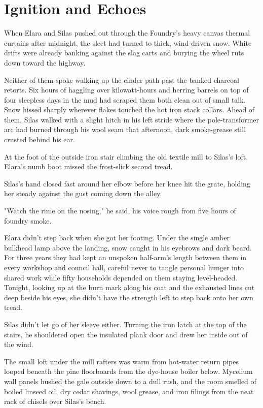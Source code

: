 \chapter{Ignition and Echoes}

When Elara and Silas pushed out through the Foundry's heavy canvas thermal curtains after midnight, the sleet had turned to thick, wind-driven snow. White drifts were already banking against the slag carts and burying the wheel ruts down toward the highway.

Neither of them spoke walking up the cinder path past the banked charcoal retorts. Six hours of haggling over kilowatt-hours and herring barrels on top of four sleepless days in the mud had scraped them both clean out of small talk. Snow hissed sharply wherever flakes touched the hot iron stack collars. Ahead of them, Silas walked with a slight hitch in his left stride where the pole-transformer arc had burned through his wool seam that afternoon, dark smoke-grease still crusted behind his ear.

At the foot of the outside iron stair climbing the old textile mill to Silas's loft, Elara's numb boot missed the frost-slick second tread.

Silas's hand closed fast around her elbow before her knee hit the grate, holding her steady against the gust coming down the alley.

"Watch the rime on the nosing," he said, his voice rough from five hours of foundry smoke.

Elara didn't step back when she got her footing. Under the single amber bulkhead lamp above the landing, snow caught in his eyebrows and dark beard. For three years they had kept an unspoken half-arm's length between them in every workshop and council hall, careful never to tangle personal hunger into shared work while fifty households depended on them staying level-headed. Tonight, looking up at the burn mark along his coat and the exhausted lines cut deep beside his eyes, she didn't have the strength left to step back onto her own tread.

Silas didn't let go of her sleeve either. Turning the iron latch at the top of the stairs, he shouldered open the insulated plank door and drew her inside out of the wind.

The small loft under the mill rafters was warm from hot-water return pipes looped beneath the pine floorboards from the dye-house boiler below. Mycelium wall panels hushed the gale outside down to a dull rush, and the room smelled of boiled linseed oil, dry cedar shavings, wool grease, and iron filings from the neat rack of chisels over Silas's bench.

